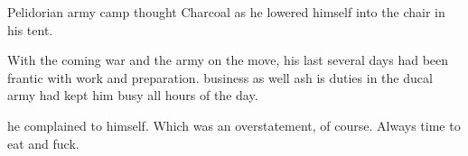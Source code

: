 %
%
%
%
%
%
%
%
%
%
%
\stamp
  {\dateCharcoalReadsDiary}
  {Pelidorian army camp}
%
%
%
 thought Charcoal as he lowered himself into the chair in his tent. 


With the coming war and the army on the move, his last several days had been frantic with work and preparation.  business as well ash is  duties in the ducal army had kept him busy all hours of the day. 

 he complained to himself. Which was an overstatement, of course. Always time to eat and fuck.

